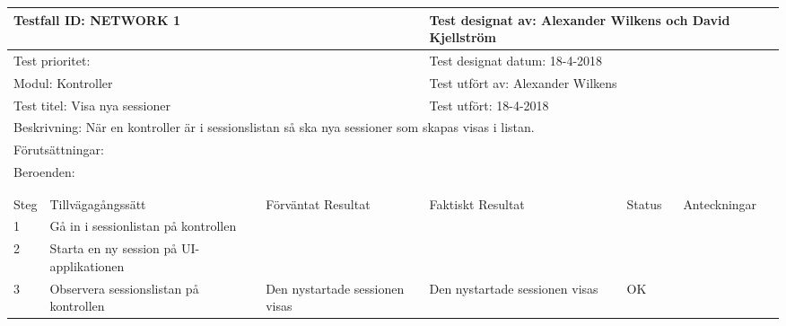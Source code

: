 
\begin{tabular}{| p{1cm}|  p{3cm} | p{3cm}| p{3cm}| p{2cm}| p{3cm}|}
	\hline
	  \multicolumn{3}{|l|}{Testfall ID: NETWORK 1}&\multicolumn{3}{|l|}{Test designat av: Alexander Wilkens och David Kjellström}\\
	  \hline
	  \multicolumn{3}{|l|}{Test prioritet:}&\multicolumn{3}{|l|}{Test designat datum: 18-4-2018}\\
	  \hline
	  \multicolumn{3}{|l|}{Modul: Kontroller}&\multicolumn{3}{|l|}{Test utfört av: Alexander Wilkens}\\
	  \hline
	  \multicolumn{3}{|l|}{Test titel: Visa nya sessioner}&\multicolumn{3}{|l|}{Test utfört: 18-4-2018}\\
	  \hline
	  \multicolumn{6}{|p{\textwidth}|}{Beskrivning: När en kontroller är i sessionslistan så ska nya sessioner som skapas visas i listan.}\\
	  \hline
	  \multicolumn{6}{|p{\textwidth}|}{Förutsättningar:}\\
	  \hline
	  \multicolumn{6}{|p{\textwidth}|}{Beroenden:}\\
  
	\hline
	\multicolumn{6}{|l|}{}\\
	\multicolumn{6}{|l|}{}\\
      	\hline
	Steg&Tillvägagångssätt&Förväntat Resultat&Faktiskt Resultat&Status&Anteckningar \\
	\hline
	1&Gå in i sessionlistan på kontrollen&&&&\\
      	\hline
	2&Starta en ny session på UI-applikationen&&&&\\
      	\hline
	3&Observera sessionslistan på kontrollen&Den nystartade sessionen visas&Den nystartade sessionen visas&OK&\\
      	\hline
\end{tabular}



